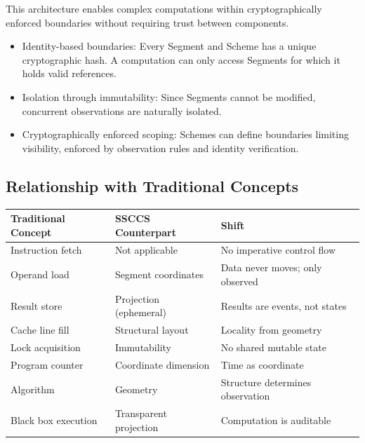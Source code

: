 \documentclass[
  a4paper,
  DIV=11,
  numbers=noendperiod]{scrartcl}
\providecommand{\tightlist}{%
  \setlength{\itemsep}{0pt}\setlength{\parskip}{0pt}}
\begin{document}
This architecture enables complex computations within cryptographically
enforced boundaries without requiring trust between components.

\begin{itemize}
\tightlist
\item
  Identity-based boundaries: Every Segment and Scheme has a unique
  cryptographic hash. A computation can only access Segments for which
  it holds valid references.
\item
  Isolation through immutability: Since Segments cannot be modified,
  concurrent observations are naturally isolated.
\item
  Cryptographically enforced scoping: Schemes can define boundaries
  limiting visibility, enforced by observation rules and identity
  verification.
\end{itemize}

\subsection{Relationship with Traditional
Concepts}\label{relationship-with-traditional-concepts}

\begin{longtable}[]{@{}
  >{\raggedright\arraybackslash}p{}
  >{\raggedright\arraybackslash}p{}
  >{\raggedright\arraybackslash}p{}@{}}
\toprule\noalign{}
\begin{minipage}[b]{\linewidth}\raggedright
Traditional Concept
\end{minipage} & \begin{minipage}[b]{\linewidth}\raggedright
SSCCS Counterpart
\end{minipage} & \begin{minipage}[b]{\linewidth}\raggedright
Shift
\end{minipage} \\
\midrule\noalign{}
\endhead
\bottomrule\noalign{}
\endlastfoot
Instruction fetch & Not applicable & No imperative control flow \\
Operand load & Segment coordinates & Data never moves; only observed \\
Result store & Projection (ephemeral) & Results are events, not
states \\
Cache line fill & Structural layout & Locality from geometry \\
Lock acquisition & Immutability & No shared mutable state \\
Program counter & Coordinate dimension & Time as coordinate \\
Algorithm & Geometry & Structure determines observation \\
Black box execution & Transparent projection & Computation is
auditable \\
\end{longtable}
\end{document}
